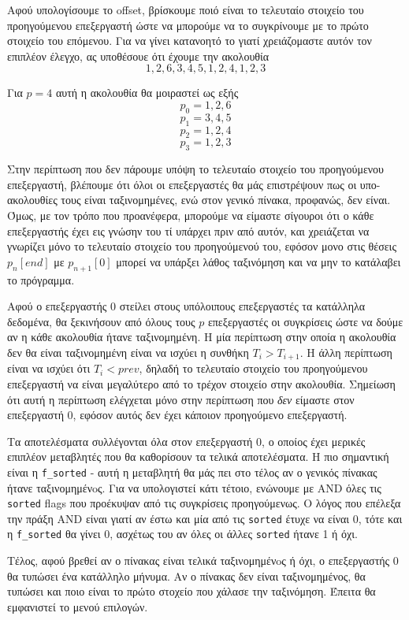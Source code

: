 \documentclass{article}
\begin{document}
Αφού υπολογίσουμε το offset, βρίσκουμε ποιό είναι το τελευταίο στοιχείο του 
προηγούμενου επεξεργαστή ώστε να μπορούμε να το συγκρίνουμε με το πρώτο στοιχείο
του επόμενου. Για να γίνει κατανοητό το γιατί χρειάζομαστε αυτόν τον επιπλέον έλεγχο,
ας υποθέσουε ότι έχουμε την ακολουθία
\[1, 2, 6, 3, 4, 5, 1, 2, 4, 1, 2, 3\]

Για $p = 4$ αυτή η ακολουθία θα μοιραστεί ως εξής
\[p_0 = 1, 2, 6\]
\[p_1 = 3, 4, 5\]
\[p_2 = 1, 2, 4\]
\[p_3 = 1, 2, 3\]

Στην περίπτωση που δεν πάρουμε υπόψη το τελευταίο στοιχείο του προηγούμενου
επεξεργαστή, βλέπουμε ότι όλοι οι επεξεργαστές θα μάς επιστρέψουν πως οι υπο-ακολουθίες
τους είναι ταξινομημένες, ενώ στον γενικό πίνακα, προφανώς, δεν είναι. Όμως, με τον
τρόπο που προανέφερα, μπορούμε να είμαστε σίγουροι ότι ο κάθε επεξεργαστής έχει
εις γνώσην του τί υπάρχει πριν από αυτόν, και χρειάζεται να γνωρίζει μόνο το τελευταίο
στοιχείο του προηγούμενού του, εφόσον μονο στις θέσεις $p_n[end]$ με $p_{n+1}[0]$ μπορεί να
υπάρξει λάθος ταξινόμηση και να μην το κατάλαβει το πρόγραμμα.

Αφού ο επεξεργαστής 0 στείλει στους υπόλοιπους επεξεργαστές τα κατάλληλα δεδομένα,
θα ξεκινήσουν από όλους τους $p$ επεξεργαστές οι συγκρίσεις ώστε να δούμε
αν η κάθε ακολουθία ήτανε ταξινομημένη. Η μία περίπτωση στην οποία η ακολουθία δεν θα
είναι ταξινομημένη είναι να ισχύει η συνθήκη $T_i > T_{i+1}$. Η άλλη περίπτωση
είναι να ισχύει ότι $T_i < prev$, δηλαδή το τελευταίο στοιχείο του προηγούμενου
επεξεργαστή να είναι μεγαλύτερο από το τρέχον στοιχείο στην ακολουθία.
Σημείωση ότι αυτή η περίπτωση ελέγχεται μόνο στην περίπτωση που \textit{δεν} είμαστε
στον επεξεργαστή 0, εφόσον αυτός δεν έχει κάποιον προηγούμενο επεξεργαστή.

Τα αποτελέσματα συλλέγονται όλα στον επεξεργαστή 0, ο οποίος έχει μερικές επιπλέον
μεταβλητές που θα καθορίσουν τα τελικά αποτελέσματα. Η πιο σημαντική είναι η
\lstinline{f_sorted} - αυτή η μεταβλητή θα μάς πει στο τέλος αν ο γενικός πίνακας ήτανε
ταξινομημένoς. Για να υπολογιστεί κάτι τέτοιο, ενώνουμε με AND όλες τις \lstinline{sorted}
flags που προέκυψαν από τις συγκρίσεις προηγούμενως. Ο λόγος που επέλεξα την πράξη
AND είναι γιατί αν έστω και μία από τις \lstinline{sorted} έτυχε να είναι 0, τότε και
η \lstinline{f_sorted} θα γίνει 0, ασχέτως του αν όλες οι άλλες \lstinline{sorted} ήτανε
1 ή όχι.

Τέλος, αφού βρεθεί αν ο πίνακας είναι τελικά ταξινομημένoς ή όχι, ο επεξεργαστής 0
θα τυπώσει ένα κατάλληλο μήνυμα. Αν ο πίνακας δεν είναι ταξινομημένος, θα τυπώσει
και ποιο είναι το πρώτο στοχείο που χάλασε την ταξινόμηση. Έπειτα θα εμφανιστεί το
μενού επιλογών.
\end{document}
